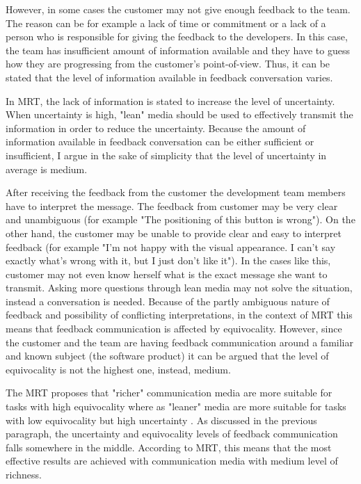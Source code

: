 \documentclass[english,12pt,a4paper,pdftex]{article}
\begin{document}
However, in some cases the customer may not give enough feedback to the team. The reason can be for example a lack of time or commitment or a lack of a person who is responsible for giving the feedback to the developers. In this case, the team has insufficient amount of information available and they have to guess how they are progressing from the customer's point-of-view. Thus, it can be stated that the level of information available in feedback conversation varies. 

In \ac{MRT}, the lack of information is stated to increase the level of uncertainty. When uncertainty is high, "lean" media should be used to effectively transmit the information in order to reduce the uncertainty. Because the amount of information available in feedback conversation can be either sufficient or insufficient, I argue in the sake of simplicity that the level of uncertainty in average is medium.

After receiving the feedback from the customer the development team members have to interpret the message. The feedback from customer may be very clear and unambiguous (for example "The positioning of this button is wrong"). On the other hand, the customer may be unable to provide clear and easy to interpret feedback (for example "I'm not happy with the visual appearance. I can't say exactly what's wrong with it, but I just don't like it"). In the cases like this, customer may not even know herself what is the exact message she want to transmit. Asking more questions through lean media may not solve the situation, instead a conversation is needed. Because of the partly ambiguous nature of feedback and possibility of conflicting interpretations, in the context of \ac{MRT} this means that feedback communication is affected by equivocality. However, since the customer and the team are having feedback communication around a familiar and known subject (the software product) it can be argued that the level of equivocality is not the highest one, instead, medium.

The \ac{MRT} proposes that "richer" communication media are more suitable for tasks with high equivocality where as "leaner" media are more suitable for tasks with low equivocality but high uncertainty \citep{daft1986}. As discussed in the previous paragraph, the uncertainty and equivocality levels of feedback communication falls somewhere in the middle. According to \ac{MRT}, this means that the most effective results are achieved with communication media with medium level of richness.
\end{document}
